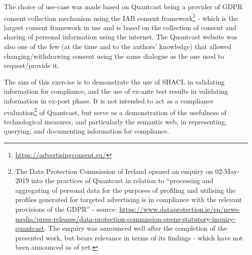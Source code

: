 The choice of use-case was made based on Quantcast being a provider of GDPR consent collection mechanism using the IAB consent framework\footnote{\url{https://advertisingconsent.eu/}} - which is the largest consent framework in use and is based on the collection of consent and sharing of personal information using the internet. The Quantcast website was also one of the few (at the time and to the authors’ knowledge) that allowed changing/withdrawing consent using the same dialogue as the one used to request/provide it.

The aim of this exercise is to demonstrate the use of SHACL in validating information for compliance, and the use of ex-ante test results in validating information in ex-post phase.
It is not intended to act as a compliance evaluation\footnote{The Data Protection Commission of Ireland opened an enquiry on 02-May-2019 into the practices of Quantcast in relation to ``processing and aggregating of personal data for the purposes of profiling and utilising the profiles generated for targeted advertising is in compliance with the relevant provisions of the GDPR'' - source: \url{https://www.dataprotection.ie/en/news-media/press-releases/data-protection-commission-opens-statutory-inquiry-quantcast}. The enquiry was announced well after the completion of the presented work, but bears relevance in terms of its findings - which have not been announced as of yet.} of Quantcast, but serve as a demonstration of the usefulness of technological measures, and particularly the semantic web, in representing, querying, and documenting information for compliance.

